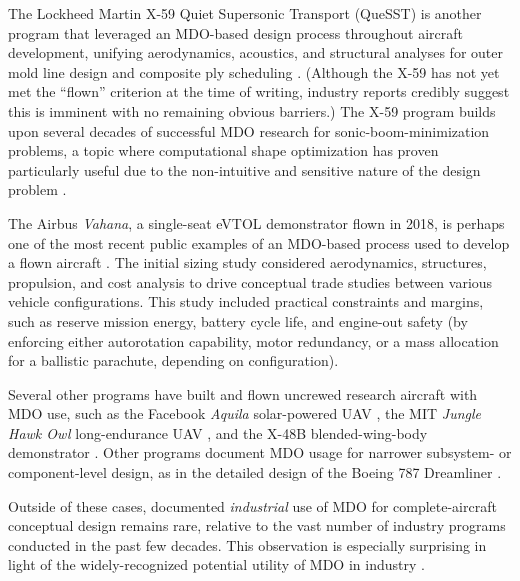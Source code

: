 The Lockheed Martin X-59 Quiet Supersonic Transport (QueSST) is another program that leveraged an MDO-based design process throughout aircraft development, unifying aerodynamics, acoustics, and structural analyses for outer mold line design and composite ply scheduling \cite{x59_nasa_nas, x59_nasa_sc19, x59_compositeworld}. (Although the X-59 has not yet met the ``flown'' criterion at the time of writing, industry reports credibly suggest this is imminent with no remaining obvious barriers.) The X-59 program builds upon several decades of successful MDO research for sonic-boom-minimization problems, a topic where computational shape optimization has proven particularly useful due to the non-intuitive and sensitive nature of the design problem \cite{choi_multifidelity_2008}.

The Airbus \textit{Vahana}, a single-seat eVTOL demonstrator flown in 2018, is perhaps one of the most recent public examples of an MDO-based process used to develop a flown aircraft \cite{vahana_1, vahana_2, vahana_code}. The initial sizing study considered aerodynamics, structures, propulsion, and cost analysis to drive conceptual trade studies between various vehicle configurations. This study included practical constraints and margins, such as reserve mission energy, battery cycle life, and engine-out safety (by enforcing either autorotation capability, motor redundancy, or a mass allocation for a ballistic parachute, depending on configuration).

Several other programs have built and flown uncrewed research aircraft with MDO use, such as the Facebook \textit{Aquila} solar-powered UAV \cite{fbhale}, the MIT \textit{Jungle Hawk Owl} long-endurance UAV \cite{jho}, and the X-48B blended-wing-body demonstrator \cite{wakayama_2000_blended, liebeck_blendedwingbody_1998, liebeck2004design}. Other programs document MDO usage for narrower subsystem- or component-level design, as in the detailed design of the Boeing 787 Dreamliner \cite{agte_mdo_2010}.

Outside of these cases, documented \textit{industrial} use of MDO for complete-aircraft conceptual design remains rare, relative to the vast number of industry programs conducted in the past few decades. This observation is especially surprising in light of the widely-recognized potential utility of MDO in industry \cite{mcmasters_airplane_2002, torenbeek_advanced_2013}.


